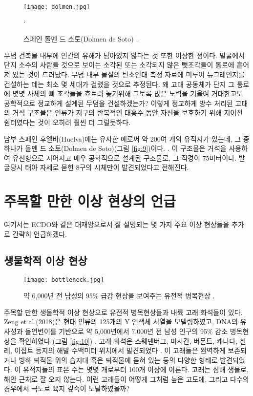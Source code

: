 \documentclass[10pt,twocolumn,letterpaper]{article}
\begin{document}
\begin{figure}[t]
\begin{center}
   \texttt{[image: dolmen.jpg]}
\end{center}
   \caption{스페인 돌멘 드 소토(Dolmen de Soto) \cite{53}.}`
\label{fig:9}
\label{fig:onecol}
\end{figure}

무덤 건축물 내부에 인간의 유해가 남아있지 않다는 것 또한 이상한 점이다. 발굴에서 단지 소수의 사람들 것으로 보이는 소각된 또는 소각되지 않은 뼛조각들이 통로에 흩어져 있는 것이 드러났다. 무덤 내부 물질의 탄소연대 측정 자료에 미루어 뉴그레인지를 건설하는 데는 최소 몇 세대가 걸렸을 것으로 추정된다. 왜 고대 공동체가 단지 그 통로에 몇몇 사체의 뼈 조각들을 흐트려 놓기위해  그토록 많은 노력을 기울여 거대한고도 공학적으로 정교하게 설계된 무덤을 건설하겠는가? 이렇게 정교하게 방수 처리된 고대의 거석 구조물은 인류가 지구의 반복적인 대홍수 동안 자신을 보호하기 위해 지어진 쉼터였다는 것이 오히려 훨씬 더 그럴듯하다.

남부 스페인 후엘바(Huelva)에는 유사한 예로써 약 200여 개의 유적지가 있는데, 그 중 하나가 돌멘 드 소토(Dolmen de Soto)(그림 \ref{fig:9})이다. \cite{72,32}. 이 구조물은 거석을 사용하여 유선형으로 지어지고 매우 공학적으로 설계된 구조물로, 그 직경이 75미터이다. 발굴당시 태아 자세로 묻힌 8구의 시체만이 발견되었다고 전해진다.

\section{주목할 만한 이상 현상의 언급}

여기서는 ECDO와 같은 대재앙으로서  잘 설명되는 몇 가지 주요 이상 현상들을 추가로 간략히 언급하겠다.

\subsection{생물학적 이상 현상}

\begin{figure}[t]
\begin{center}
   \texttt{[image: bottleneck.jpg]}
\end{center}
   \caption{약 6,000년 전 남성의 95\% 급감 현상을 보여주는 유전적 병목현상 \cite{62}.}
\label{fig:10}
\label{fig:onecol}
\end{figure}

주목할 만한 생물학적 이상 현상으로 유전적 병목현상들과 내륙 고래 화석들이 있다. Zeng et al.(2018)은 현대 인류의 125개의 Y 염색체 서열을 모델링하였고, DNA의 유사성과 돌연변이를 기반으로 약 5,000년에서 7,000년 전  남성 인구의 95\% 감소 병목현상을 확인하였다 (그림 \ref{fig:10}) \cite{62}. 고래 화석은 스웨덴버그, 미시간, 버몬트, 캐나다, 칠레, 이집트 등지의 해발 수백미터 위치에서 발견되었다 \cite{63,64,65,66}. 이 고래들은 완벽하게 보존되거나  빙하 퇴적물 위의 습지대 혹은  퇴적물에 묻혀 있는 등의 다양한 형태로 발견되었다. 이 유적지들의 표본 수는 몇몇 개로부터 100개 이상에 이른다. 고래는 심해 생물로, 해안 근처로 잘 오지 않는다. 이런 고래들이 어떻게 그처럼 높은 고도에, 그리고 다수의 경우에서 극도로 육지 깊숙이 도달하였을까?
\end{document}
